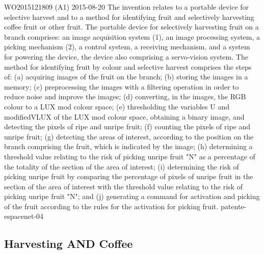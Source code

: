 {WO2015121809 (A1)}%
{2015-08-20}%
{The invention relates to a portable device for selective harvest and to a
  method for identifying fruit and selectively harvesting coffee fruit or other
  fruit. The portable device for selectively harvesting fruit on a branch
  comprises: an image acquisition system (1), an image processing system, a
  picking mechanism (2), a control system, a receiving mechanism, and a system
  for powering the device, the device also comprising a servo-vision system. The
  method for identifying fruit by colour and selective harvest comprises the
  steps of: (a) acquiring images of the fruit on the branch; (b) storing the
  images in a memory; (c) preprocessing the images with a filtering operation in
  order to reduce noise and improve the images; (d) converting, in the images,
  the RGB colour to a LUX mod colour space; (e) thresholding the variables U and
  modifiedVLUX of the LUX mod colour space, obtaining a binary image, and
  detecting the pixels of ripe and unripe fruit; (f) counting the pixels of ripe
  and unripe fruit; (g) detecting the areas of interest, according to the
  position on the branch comprising the fruit, which is indicated by the image;
  (h) determining a threshold value relating to the risk of picking unripe fruit
  "N" as a percentage of the totality of the section of the area of interest;
  (i) determining the risk of picking unripe fruit by comparing the percentage
  of pixels of unripe fruit in the section of the area of interest with the
  threshold value relating to the risk of picking unripe fruit "N"; and (j)
  generating a command for activation and picking of the fruit according to the
  rules for the activation for picking fruit.}%
{patente-espacenet-04}%

\subsection{Harvesting AND Coffee}
\label{sec:harvesting-coffee-1}

